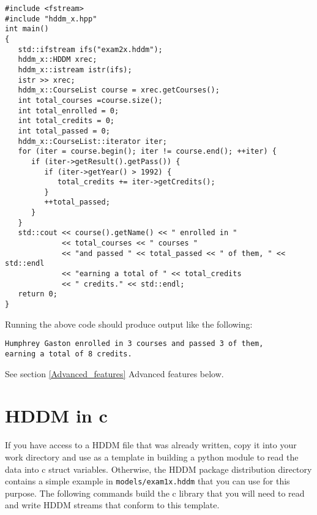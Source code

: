 \documentclass{revtex4}
\begin{document}
\vspace{0.5cm}
\begin{minipage}{12cm}
\begin{verbatim}
#include <fstream>
#include "hddm_x.hpp"
int main()
{
   std::ifstream ifs("exam2x.hddm");
   hddm_x::HDDM xrec;
   hddm_x::istream istr(ifs);
   istr >> xrec;
   hddm_x::CourseList course = xrec.getCourses();
   int total_courses =course.size();
   int total_enrolled = 0;
   int total_credits = 0;
   int total_passed = 0;
   hddm_x::CourseList::iterator iter;
   for (iter = course.begin(); iter != course.end(); ++iter) {
      if (iter->getResult().getPass()) {
         if (iter->getYear() > 1992) {
            total_credits += iter->getCredits();
         }
         ++total_passed;
      }
   }
   std::cout << course().getName() << " enrolled in "
             << total_courses << " courses "
             << "and passed " << total_passed << " of them, " << std::endl
             << "earning a total of " << total_credits
             << " credits." << std::endl;
   return 0;
}
\end{verbatim}
\end{minipage}
\vspace{0.5cm}

Running the above code should produce output like the following:

\vspace{0.5cm}
\begin{minipage}{12cm}
\begin{verbatim}
Humphrey Gaston enrolled in 3 courses and passed 3 of them,
earning a total of 8 credits.
\end{verbatim}
\end{minipage}
\vspace{0.5cm}

See section \ref{Advanced_features} {Advanced features} below.

\section{HDDM in c}

If you have access to a HDDM file that was already written, copy it into your
work directory and use as a template in building a python module to read the data
into c struct variables. Otherwise, the HDDM package distribution directory
contains a simple example in \texttt{models/exam1x.hddm} that you can use for
this purpose. The following commands build the c library that you will need
to read and write HDDM streams that conform to this template.
\end{document}
